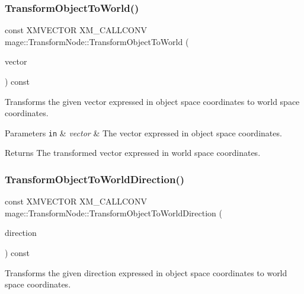 \subsubsection{\texorpdfstring{Transform\+Object\+To\+World()}{TransformObjectToWorld()}}
{\footnotesize\ttfamily const X\+M\+V\+E\+C\+T\+OR X\+M\+\_\+\+C\+A\+L\+L\+C\+O\+NV mage\+::\+Transform\+Node\+::\+Transform\+Object\+To\+World (\begin{DoxyParamCaption}\item[{F\+X\+M\+V\+E\+C\+T\+OR}]{vector }\end{DoxyParamCaption}) const\hspace{0.3cm}{\ttfamily [noexcept]}}

Transforms the given vector expressed in object space coordinates to world space coordinates.


\begin{DoxyParams}[1]{Parameters}
\mbox{\tt in}  & {\em vector} & The vector expressed in object space coordinates. \\
\hline
\end{DoxyParams}
\begin{DoxyReturn}{Returns}
The transformed vector expressed in world space coordinates. 
\end{DoxyReturn}
\hypertarget{structmage_1_1_transform_node_aacbb3c43db6a7b67170654e1ffc70892}{}\label{structmage_1_1_transform_node_aacbb3c43db6a7b67170654e1ffc70892} 
\subsubsection{\texorpdfstring{Transform\+Object\+To\+World\+Direction()}{TransformObjectToWorldDirection()}}
{\footnotesize\ttfamily const X\+M\+V\+E\+C\+T\+OR X\+M\+\_\+\+C\+A\+L\+L\+C\+O\+NV mage\+::\+Transform\+Node\+::\+Transform\+Object\+To\+World\+Direction (\begin{DoxyParamCaption}\item[{F\+X\+M\+V\+E\+C\+T\+OR}]{direction }\end{DoxyParamCaption}) const\hspace{0.3cm}{\ttfamily [noexcept]}}

Transforms the given direction expressed in object space coordinates to world space coordinates.



